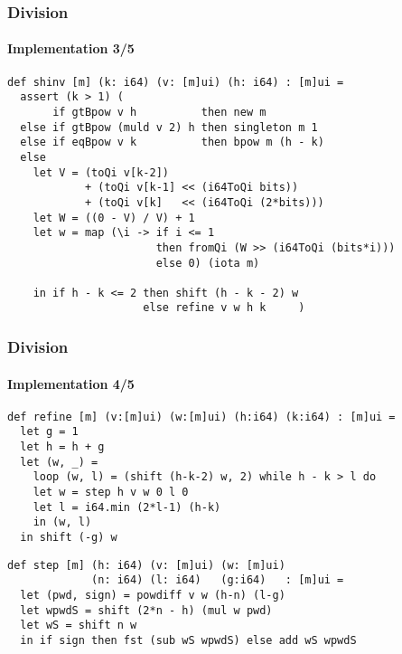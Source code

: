 \begin{frame}[fragile]
  \frametitle{Division}
  \framesubtitle{Implementation 3/5}
\begin{lstlisting}[language=futhark,basicstyle=\scriptsize,escapeinside=@@,firstnumber=18,frame=single]
def shinv [m] (k: i64) (v: [m]ui) (h: i64) : [m]ui =
  assert (k > 1) (
       if gtBpow v h          then new m
  else if gtBpow (muld v 2) h then singleton m 1
  else if eqBpow v k          then bpow m (h - k)
  else
    let V = (toQi v[k-2])
            + (toQi v[k-1] << (i64ToQi bits))
            + (toQi v[k]   << (i64ToQi (2*bits)))
    let W = ((0 - V) / V) + 1
    let w = map (\i -> if i <= 1
                       then fromQi (W >> (i64ToQi (bits*i)))
                       else 0) (iota m)

    in if h - k <= 2 then shift (h - k - 2) w
                     else refine v w h k     )
\end{lstlisting}
\end{frame}

\begin{frame}[fragile]
  \frametitle{Division}
  \framesubtitle{Implementation 4/5}
\begin{lstlisting}[language=futhark,basicstyle=\scriptsize,escapeinside=@@,firstnumber=34,frame=single]
def refine [m] (v:[m]ui) (w:[m]ui) (h:i64) (k:i64) : [m]ui =
  let g = 1
  let h = h + g
  let (w, _) =
    loop (w, l) = (shift (h-k-2) w, 2) while h - k > l do
    let w = step h v w 0 l 0
    let l = i64.min (2*l-1) (h-k)
    in (w, l)
  in shift (-g) w
\end{lstlisting}\vspace*{0.5em}

\begin{lstlisting}[language=futhark,basicstyle=\scriptsize,escapeinside=@@,firstnumber=43,frame=single]
def step [m] (h: i64) (v: [m]ui) (w: [m]ui)
             (n: i64) (l: i64)   (g:i64)   : [m]ui =
  let (pwd, sign) = powdiff v w (h-n) (l-g)
  let wpwdS = shift (2*n - h) (mul w pwd)
  let wS = shift n w
  in if sign then fst (sub wS wpwdS) else add wS wpwdS
\end{lstlisting}
\end{frame}


